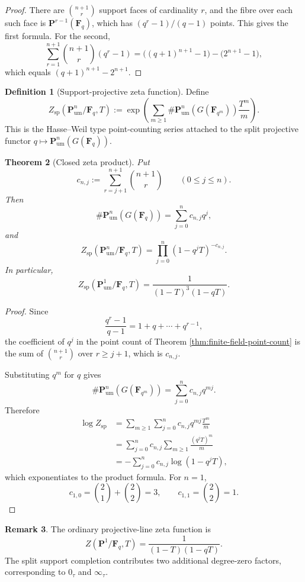 \documentclass[11pt]{amsart}
\numberwithin{equation}{section}
\newtheorem{theorem}{Theorem}[section]
\theoremstyle{definition}
\newtheorem{definition}[theorem]{Definition}
\newtheorem{remark}[theorem]{Remark}
\newcommand{\F}{\mathbf F}
\newcommand{\Pum}{\mathbf P_{\mathrm{um}}}
\begin{document}
\begin{proof}
There are $\binom{n+1}{r}$ support faces of cardinality $r$, and the fibre over each such face is $\mathbf P^{r-1}(\F_q)$, which has $(q^r-1)/(q-1)$ points.  This gives the first formula.  For the second,
\[
\sum_{r=1}^{n+1}\binom{n+1}{r}(q^r-1)
=
\bigl((q+1)^{n+1}-1\bigr)-\bigl(2^{n+1}-1\bigr),
\]
which equals $(q+1)^{n+1}-2^{n+1}$.
\end{proof}

\begin{definition}[Support-projective zeta function]\label{def:support-zeta}
Define
\[
Z_{\mathrm{sp}}(\Pum^n/\F_q,T)
:=
\exp\left(
\sum_{m\ge1}
\#\Pum^n(G(\F_{q^m}))\frac{T^m}{m}
\right).
\]
This is the Hasse--Weil type point-counting series attached to the split projective functor $q\mapsto\Pum^n(G(\F_q))$.
\end{definition}

\begin{theorem}[Closed zeta product]\label{thm:support-zeta-product}
Put
\[
c_{n,j}:=\sum_{r=j+1}^{n+1}\binom{n+1}{r}
\qquad(0\le j\le n).
\]
Then
\[
\#\Pum^n(G(\F_q))
=
\sum_{j=0}^{n}c_{n,j}q^j,
\]
and
\[
\boxed{
Z_{\mathrm{sp}}(\Pum^n/\F_q,T)
=
\prod_{j=0}^{n}(1-q^jT)^{-c_{n,j}}.}
\]
In particular,
\[
Z_{\mathrm{sp}}(\Pum^1/\F_q,T)
=
\frac{1}{(1-T)^3(1-qT)}.
\]
\end{theorem}

\begin{proof}
Since
\[
\frac{q^r-1}{q-1}=1+q+\cdots+q^{r-1},
\]
the coefficient of $q^j$ in the point count of Theorem \ref{thm:finite-field-point-count} is the sum of $\binom{n+1}{r}$ over $r\ge j+1$, which is $c_{n,j}$.

Substituting $q^m$ for $q$ gives
\[
\#\Pum^n(G(\F_{q^m}))
=
\sum_{j=0}^{n}c_{n,j}q^{mj}.
\]
Therefore
\[
\begin{aligned}
\log Z_{\mathrm{sp}}
&=
\sum_{m\ge1}\sum_{j=0}^{n}c_{n,j}q^{mj}\frac{T^m}{m}\\
&=
\sum_{j=0}^{n}c_{n,j}
\sum_{m\ge1}\frac{(q^jT)^m}{m}\\
&=
-\sum_{j=0}^{n}c_{n,j}\log(1-q^jT),
\end{aligned}
\]
which exponentiates to the product formula.  For $n=1$,
\[
c_{1,0}=\binom21+\binom22=3,
\qquad
c_{1,1}=\binom22=1.
\]
\end{proof}

\begin{remark}
The ordinary projective-line zeta function is
\[
Z(\mathbf P^1/\F_q,T)=\frac{1}{(1-T)(1-qT)}.
\]
The split support completion contributes two additional degree-zero factors, corresponding to $0_\tau$ and $\infty_\tau$.
\end{remark}
\end{document}
